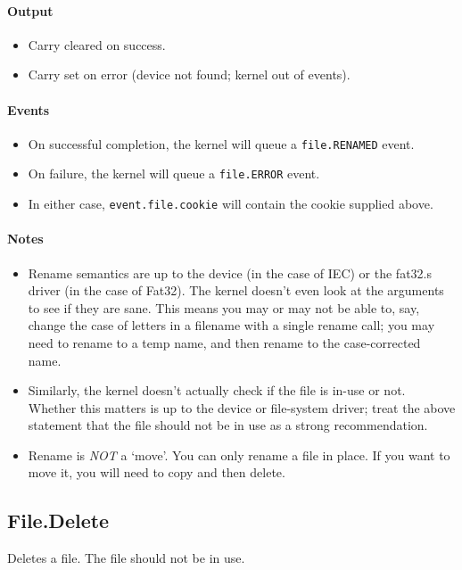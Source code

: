 \paragraph{Output}
\begin{itemize}
\item Carry cleared on success.
\item Carry set on error (device not found; kernel out of events).
\end{itemize}

\paragraph{Events}
\begin{itemize}
\item On successful completion, the kernel will queue a \verb+file.RENAMED+ event.
\item On failure, the kernel will queue a \verb+file.ERROR+ event.
\item In either case, \verb+event.file.cookie+ will contain the cookie supplied above.
\end{itemize}

\paragraph{Notes}
\begin{itemize}
\item Rename semantics are up to the device (in the case of IEC) or the fat32.s driver (in the case of Fat32).  The kernel doesn't even look at the arguments to see if they are sane.  This means you may or may not be able to, say, change the case of letters in a filename with a single rename call; you may need to rename to a temp name, and then rename to the case-corrected name.

\item Similarly, the kernel doesn't actually check if the file is in-use or not.  Whether this matters is up to the device or file-system driver; treat the above statement that the file should not be in use as a strong recommendation. 

\item Rename is {\em NOT} a `move'.  You can only rename a file in place.  If you want to move it, you will need to copy and then delete.
\end{itemize}

\subsection*{File.Delete}
Deletes a file.  The file should not be in use.

